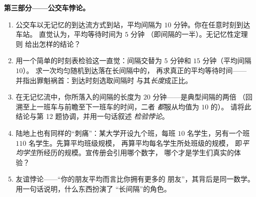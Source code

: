 \begin{problem}
\medskip
\noindent\textbf{第三部分——公交车悖论。}
\begin{enumerate}[resume]
  \item 公交车以无记忆的到达流方式到站，平均间隔为 $10$
        分钟。你在任意时刻到达车站。
        直觉认为，平均等待时间为 $5$ 分钟
        （即间隔的一半）。无记忆性定理则
        给出怎样的结论？
  \item 用一个简单的时刻表检验这一直觉：间隔交替为
        $5$ 分钟和 $15$ 分钟（平均间隔 $10$）。
        求一次均匀随机到达落在长间隔中的，
        再求真正的平均等待时间——
        并指出罪魁祸首：到达时刻选取间隔时
        与其\emph{长度}成正比。
  \item 在无记忆流中，你所落入的间隔的长度为
        $20$ 分钟——是典型间隔的两倍
        （回溯至上一班车与前瞻至下一班车的时间，二者
        \emph{都}服从均值为 $10$ 的）。
        请将此结论与第 12 题协调，并用一句话叙述
        \emph{检验悖论}。
  \item 陆地上也有同样的“刺痛”：某大学开设九个班，每班
        $10$ 名学生，另有一个班 $110$ 名学生。先算平均班级规模，
        再算平均每名学生所处班级的规模，
        即\emph{平均学生}所经历的规模。宣传册会引用哪个数字，
        哪个才是学生们真实的体验？
  \item 友谊悖论——“你的朋友平均而言比你拥有更多的
        朋友”，其背后是同一数学。
        用一句话说明，什么东西扮演了
        “长间隔”的角色。
\end{enumerate}


\end{problem}
